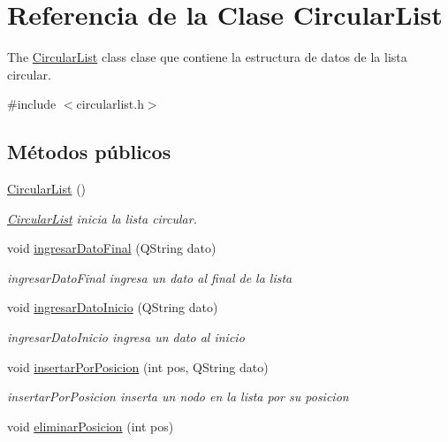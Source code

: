 \hypertarget{class_circular_list}{}\section{Referencia de la Clase Circular\+List}
\label{class_circular_list}


The \mbox{\hyperlink{class_circular_list}{Circular\+List}} class clase que contiene la estructura de datos de la lista circular.  




{\ttfamily \#include $<$circularlist.\+h$>$}

\subsection*{Métodos públicos}
\begin{DoxyCompactItemize}
\item 
\mbox{\hyperlink{class_circular_list_ad4877c840f41f3119b1378e7ac35386c}{Circular\+List}} ()
\begin{DoxyCompactList}\small\item\em \mbox{\hyperlink{class_circular_list}{Circular\+List}} inicia la lista circular. \end{DoxyCompactList}\item 
void \mbox{\hyperlink{class_circular_list_a4d9c44a0352121d91be126746b48408f}{ingresar\+Dato\+Final}} (Q\+String dato)
\begin{DoxyCompactList}\small\item\em ingresar\+Dato\+Final ingresa un dato al final de la lista \end{DoxyCompactList}\item 
void \mbox{\hyperlink{class_circular_list_a4d498cd4c405704101003b90d782bb93}{ingresar\+Dato\+Inicio}} (Q\+String dato)
\begin{DoxyCompactList}\small\item\em ingresar\+Dato\+Inicio ingresa un dato al inicio \end{DoxyCompactList}\item 
void \mbox{\hyperlink{class_circular_list_ad2dd3f4b5934900494ba50714306a89f}{insertar\+Por\+Posicion}} (int pos, Q\+String dato)
\begin{DoxyCompactList}\small\item\em insertar\+Por\+Posicion inserta un nodo en la lista por su posicion \end{DoxyCompactList}\item 
void \mbox{\hyperlink{class_circular_list_a7cf69aaaf998bac2f5342da4adc5e55d}{eliminar\+Posicion}} (int pos)

\end{DoxyCompactItemize}
